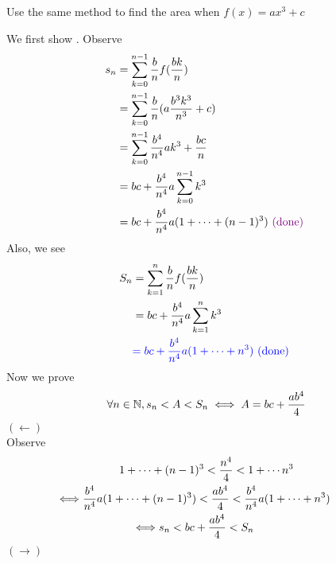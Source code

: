 \documentclass{report}
\begin{document}
\begin{question}{}{}
Use the same method to find the area when $f(x)=ax^3+c$
\end{question}
\begin{solution}
We first show . Observe
\begin{align}
  s_n&=\sum_{k=0}^{n-1}\frac{b}{n}f(\frac{bk}{n})\\
     &= \sum_{k=0}^{n-1} \frac{b}{n}(a \frac{b^3k^3}{n^3}+c) \\
     &= \sum_{k=0}^{n-1} \frac{b^4}{n^4}ak^3+\frac{bc}{n}\\
     &= bc+ \frac{b^4}{n^4}a \sum_{k=0}^{n-1}k^3 \\
     &= bc+\frac{b^4}{n^4}a(1+\cdots +(n-1)^3) \textcolor{violet}{\text{ (done) }}
\end{align}
Also, we see
\begin{align}
  S_n&= \sum_{k=1}^{n}\frac{b}{n}f(\frac{bk}{n})\\ 
&= bc+\frac{b^4}{n^4}a \sum_{k=1}^{n}k^3 \\
&\textcolor{blue}{= bc+\frac{b^4}{n^4}a(1+\cdots +n^3)\text{ (done) }}
\end{align}
Now we prove
\begin{equation}
\forall n\in \mathbb{N}, s_n<A<S_n\iff A=bc+\frac{ab^4}{4}
\end{equation}
$(\longleftarrow)$\\

Observe
\begin{gather}
1+\cdots +(n-1)^3<\frac{n^4}{4}<1+\cdots n^3\\
\liff \frac{b^4}{n^4}a(1+\cdots +(n-1)^3)<\frac{ab^4}{4}<\frac{b^4}{n^4}a(1+\cdots +n^3)\\
\liff s_n<bc+\frac{ab^4}{4}<S_n
\end{gather}
$(\longrightarrow)$\\


\end{solution}
\end{document}
